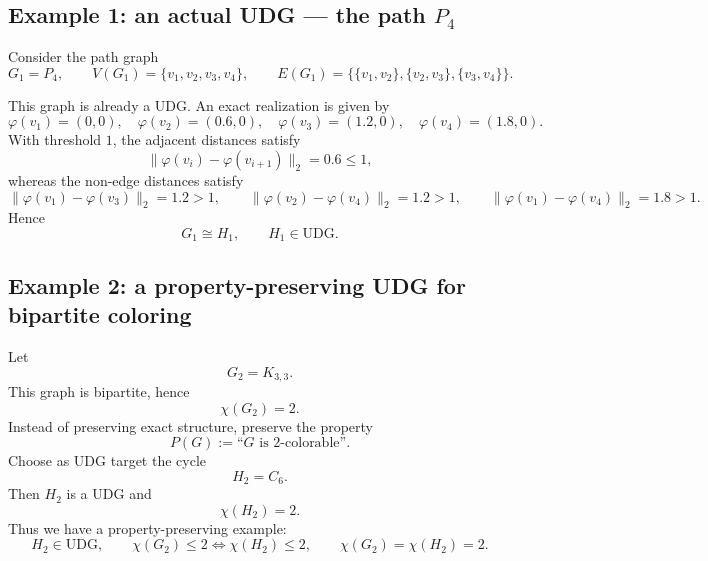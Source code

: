 \documentclass[11pt]{article}
\newcommand{\UDG}{\mathrm{UDG}}
\begin{document}
\subsection{Example 1: an actual UDG --- the path $P_4$}

Consider the path graph
\[
G_1=P_4,
\qquad
V(G_1)=\{v_1,v_2,v_3,v_4\},
\qquad
E(G_1)=\{\{v_1,v_2\},\{v_2,v_3\},\{v_3,v_4\}\}.
\]

This graph is already a UDG. An exact realization is given by
\[
\varphi(v_1)=(0,0),\quad
\varphi(v_2)=(0.6,0),\quad
\varphi(v_3)=(1.2,0),\quad
\varphi(v_4)=(1.8,0).
\]
With threshold $1$, the adjacent distances satisfy
\[
\|\varphi(v_i)-\varphi(v_{i+1})\|_2=0.6\le 1,
\]
whereas the non-edge distances satisfy
\[
\|\varphi(v_1)-\varphi(v_3)\|_2=1.2>1,
\qquad
\|\varphi(v_2)-\varphi(v_4)\|_2=1.2>1,
\qquad
\|\varphi(v_1)-\varphi(v_4)\|_2=1.8>1.
\]
Hence
\[
G_1\cong H_1,
\qquad
H_1\in \UDG.
\]

\begin{center}
\end{center}

\subsection{Example 2: a property-preserving UDG for bipartite coloring}

Let
\[
G_2 = K_{3,3}.
\]
This graph is bipartite, hence
\[
\chi(G_2)=2.
\]
Instead of preserving exact structure, preserve the property
\[
P(G) := \text{``$G$ is $2$-colorable''}.
\]
Choose as UDG target the cycle
\[
H_2=C_6.
\]
Then $H_2$ is a UDG and
\[
\chi(H_2)=2.
\]
Thus we have a property-preserving example:
\[
H_2\in\UDG,
\qquad
\chi(G_2)\le 2 \iff \chi(H_2)\le 2,
\qquad
\chi(G_2)=\chi(H_2)=2.
\]
\end{document}
